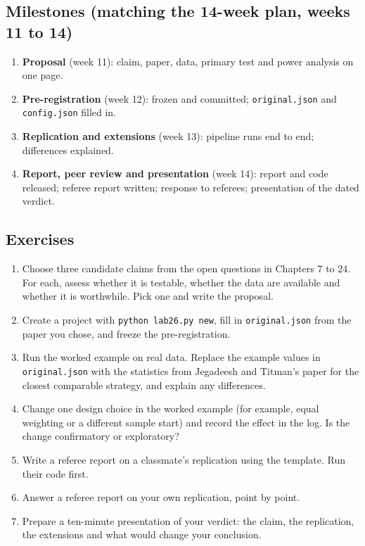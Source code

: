 \subsection*{Milestones (matching the 14-week plan, weeks 11 to 14)}

\begin{enumerate}
  \item \textbf{Proposal} (week 11): claim, paper, data, primary test and power analysis on one page.
  \item \textbf{Pre-registration} (week 12): frozen and committed; \texttt{original.json} and \texttt{config.json} filled in.
  \item \textbf{Replication and extensions} (week 13): pipeline runs end to end; differences explained.
  \item \textbf{Report, peer review and presentation} (week 14): report and code released; referee report written; response to referees; presentation of the dated verdict.
\end{enumerate}

\subsection*{Exercises}

\begin{enumerate}
  \item Choose three candidate claims from the open questions in Chapters 7 to 24. For each, assess whether it is testable, whether the data are available and whether it is worthwhile. Pick one and write the proposal.
  \item Create a project with \texttt{python lab26.py new}, fill in \texttt{original.json} from the paper you chose, and freeze the pre-registration.
  \item {\sloppy Run the worked example on real data. Replace the example values in \texttt{original.json} with the statistics from Jegadeesh and Titman's paper for the closest comparable strategy, and explain any differences.\par}
  \item Change one design choice in the worked example (for example, equal weighting or a different sample start) and record the effect in the log. Is the change confirmatory or exploratory?
  \item Write a referee report on a classmate's replication using the template. Run their code first.
  \item Answer a referee report on your own replication, point by point.
  \item Prepare a ten-minute presentation of your verdict: the claim, the replication, the extensions and what would change your conclusion.
\end{enumerate}

